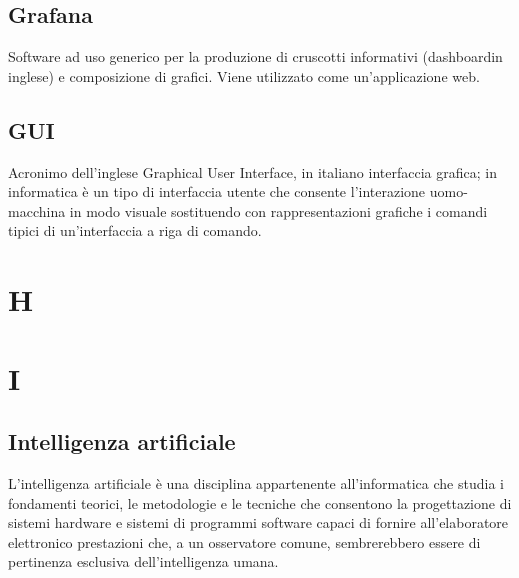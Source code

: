 \subsection*{Grafana}
Software ad uso generico per la produzione di cruscotti informativi (dashboard\glosp in inglese) e composizione di grafici. Viene utilizzato come un'applicazione web.

\subsection*{GUI}
Acronimo dell'inglese Graphical User Interface, in italiano interfaccia grafica; in informatica è un tipo di interfaccia utente che consente l'interazione uomo-macchina in modo visuale 
sostituendo con rappresentazioni grafiche i comandi tipici di un'interfaccia a riga di comando.


\clearpage
\section*{H}



\clearpage
\section*{I}
\subsection*{Intelligenza artificiale}
L'intelligenza artificiale è una disciplina appartenente all'informatica che studia i fondamenti teorici, le metodologie e le tecniche che consentono la progettazione di sistemi hardware e sistemi di programmi software capaci di fornire all'elaboratore elettronico prestazioni che, a un osservatore comune, sembrerebbero essere di pertinenza esclusiva dell'intelligenza umana.

